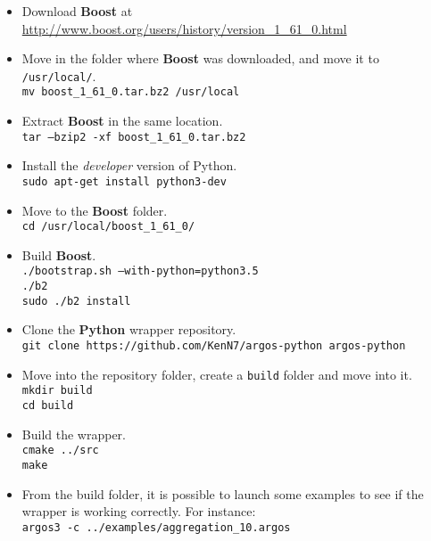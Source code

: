 \documentclass[
12pt,
a4paper,
oneside,
headinclude,
footinclude]{article}
\theoremstyle{definition} %
\begin{document}
\begin{itemize}
    \item Download \textbf{Boost} at \href{http://www.boost.org/users/history/version\_1\_61\_0.html}{http://www.boost.org/users/history/version\_1\_61\_0.html}
    
    \item Move in the folder where \textbf{Boost} was downloaded, and move it to \texttt{/usr/local/}.\\
    \-\quad\texttt{mv boost\_1\_61\_0.tar.bz2 /usr/local}
    
    \item Extract \textbf{Boost} in the same location.\\
    \-\quad\texttt{tar --bzip2 -xf boost\_1\_61\_0.tar.bz2}
    
    \item Install the \textit{developer} version of Python.\\
    \-\quad\texttt{sudo apt-get install python3-dev}   
    
    \item Move to the \textbf{Boost} folder.\\
    \-\quad\texttt{cd /usr/local/boost\_1\_61\_0/}
    
    \item Build \textbf{Boost}.\\
    \-\quad\texttt{./bootstrap.sh --with-python=python3.5}\\
    \-\quad\texttt{./b2}\\
    \-\quad\texttt{sudo ./b2 install}
    
    \item Clone the \textbf{Python} wrapper repository.\\
    \-\quad\texttt{git clone https://github.com/KenN7/argos-python argos-python}
    
    \item Move into the repository folder, create a \texttt{build} folder and move into it.\\
    \-\quad\texttt{mkdir build}\\
    \-\quad\texttt{cd build}
    
    \item Build the wrapper.\\
    \-\quad\texttt{cmake ../src}\\
    \-\quad\texttt{make}
    
    \item From the build folder, it is possible to launch some examples to see if the wrapper is working correctly. For instance:\\
    \-\quad\texttt{argos3 -c ../examples/aggregation\_10.argos}
\end{itemize}
\end{document}
